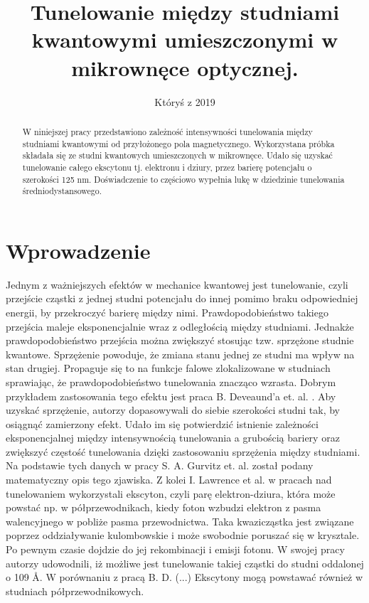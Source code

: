 \documentclass[licencjacka]{pracamgr}
\title{Tunelowanie między studniami kwantowymi umieszczonymi w mikrownęce optycznej.}
\date{Któryś z 2019}
\begin{document}
\maketitle

\begin{abstract}
  W niniejszej pracy przedstawiono zależność intensywności tunelowania między studniami kwantowymi od przyłożonego pola magnetycznego. Wykorzystana próbka składała się ze studni kwantowych umieszczonych w mikrownęce. Udało się uzyskać tunelowanie całego ekscytonu tj. elektronu i dziury, przez barierę potencjału o szerokości 125 nm. Doświadczenie to częściowo wypełnia lukę w dziedzinie tunelowania średniodystansowego.
\end{abstract}


\chapter*{Wprowadzenie}
%
Jednym z ważniejszych efektów w mechanice kwantowej jest tunelowanie, czyli przejście cząstki z jednej studni potencjału do innej pomimo braku odpowiedniej energii, by przekroczyć barierę między nimi. Prawdopodobieństwo takiego przejścia maleje eksponencjalnie wraz z odległością między studniami. Jednakże prawdopodobieństwo przejścia można zwiększyć stosując tzw. sprzężone studnie kwantowe. Sprzężenie powoduje, że zmiana stanu jednej ze studni ma wpływ na stan drugiej. Propaguje się to na funkcje falowe zlokalizowane w studniach sprawiając, że prawdopodobieństwo tunelowania znacząco wzrasta. Dobrym przykładem zastosowania tego efektu jest praca B. Deveaund'a et. al. \cite{1990}. Aby uzyskać sprzężenie, autorzy dopasowywali do siebie szerokości studni tak, by osiągnąć zamierzony efekt. Udało im się potwierdzić istnienie zależności eksponencjalnej między intensywnością tunelowania a grubością bariery oraz zwiększyć częstość tunelowania dzięki zastosowaniu sprzężenia między studniami. Na podstawie tych danych w pracy S. A. Gurvitz et. al. \cite{1991} został podany matematyczny opis tego zjawiska. Z kolei I. Lawrence et al. \cite{1994} w pracach nad tunelowaniem wykorzystali ekscyton, czyli parę elektron-dziura, która może powstać np. w półprzewodnikach, kiedy foton wzbudzi elektron z pasma walencyjnego w pobliże pasma przewodnictwa. Taka kwazicząstka jest związane poprzez oddziaływanie kulombowskie i może swobodnie poruszać się w krysztale. Po pewnym czasie dojdzie do jej rekombinacji i emisji fotonu. W swojej pracy autorzy udowodnili, iż możliwe jest tunelowanie takiej cząstki do studni oddalonej o 109 \r{A}. W porównaniu z pracą B. D. (...) Ekscytony mogą powstawać również w studniach półprzewodnikowych. %
\end{document}
